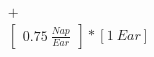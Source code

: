 \documentclass[preview]{standalone}
\begin{document}
\begin{align*}
[2 \ Nose]  + \\ \begin{bmatrix} 0.75 \ \frac{Nap}{Ear} \end{bmatrix} *  [1 \ Ear]
\end{align*}
\end{document}
